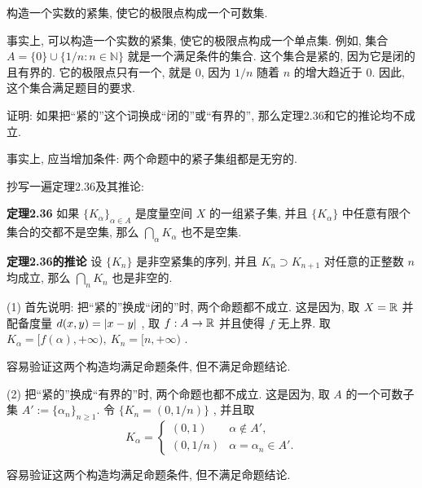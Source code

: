 \documentclass{article}
\begin{document}
\begin{problem}[2-13]
    构造一个实数的紧集, 使它的极限点构成一个可数集.
\end{problem}

\begin{solution}
    事实上, 可以构造一个实数的紧集, 使它的极限点构成一个单点集. 例如, 集合 $A = \{0\} \cup \{1/n : n \in \mathbb{N}\}$ 就是一个满足条件的集合. 这个集合是紧的, 因为它是闭的且有界的. 它的极限点只有一个, 就是 $0$, 因为 $1/n$ 随着 $n$ 的增大趋近于 $0$. 因此, 这个集合满足题目的要求.
\end{solution}

\begin{problem}[2-15]
    证明: 如果把“紧的”这个词换成“闭的”或“有界的”, 那么定理2.36和它的推论均不成立.
\end{problem}

\begin{note}
    事实上, 应当增加条件: 两个命题中的紧子集组都是无穷的.
\end{note}

\begin{solution}
    抄写一遍定理2.36及其推论:\par
    \textbf{定理2.36} {\kaishu 如果 \( \{K_\alpha\}_{\alpha \in A} \) 是度量空间 \( X \) 的一组紧子集, 并且 \( \{K_\alpha\} \) 中任意有限个集合的交都不是空集, 那么 \( \bigcap_\alpha K_\alpha \) 也不是空集.}\par
    \textbf{定理2.36的推论} {\kaishu 设 \( \{K_n\} \) 是非空紧集的序列, 并且 \( K_n\supset K_{n+1} \) 对任意的正整数 \( n \) 均成立, 那么 \( \bigcap_n K_n \) 也是非空的.}\par
    (1) 首先说明: 把“紧的”换成“闭的”时, 两个命题都不成立. 这是因为, 取 \( X=\mathbb{R} \) 并配备度量 \( d(x,y)=\left|x-y\right| \) , 取 \( f: A\to\mathbb{R} \) 并且使得 \( f \) 无上界. 取 \( K_\alpha=[f(\alpha),+\infty),\ K_n=[n,+\infty) \) .\par
    容易验证这两个构造均满足命题条件, 但不满足命题结论.\par
    (2) 把“紧的”换成“有界的”时, 两个命题也都不成立. 这是因为, 取 \( A \) 的一个可数子集 \( A':=\{\alpha_n\}_{n\ge 1} \). 令 \( \{K_n=(0,1/n)\} \) , 并且取
    \[ K_\alpha=\begin{cases}
    (0,1) & \alpha\not\in A', \\
     (0,1/n) & \alpha=\alpha_n\in A'.
    \end{cases} \]  \par
    容易验证这两个构造均满足命题条件, 但不满足命题结论.
\end{solution}
\end{document}
